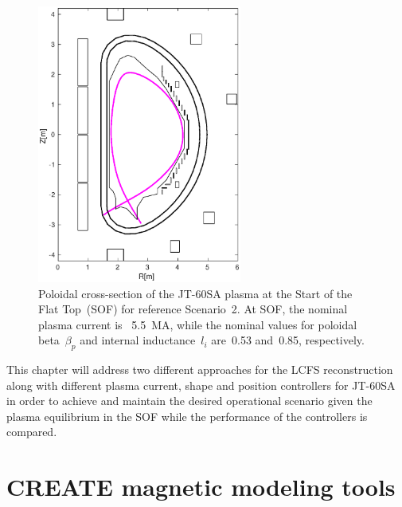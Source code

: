 \begin{figure}[h]
	\centering
	\includegraphics[width=0.6\textwidth]{Chp3/scenario2_SOF.eps}
	
	\caption{Poloidal cross-section of the JT-60SA plasma at the Start of the Flat Top~(SOF) for reference Scenario~2. At SOF, the nominal plasma current is ~5.5~MA, while the nominal values for poloidal beta~$\beta_p$ and internal inductance~$l_i$ are~0.53 and~0.85, respectively.	\label{SOF}}
\end{figure}



This chapter will address two different approaches for the LCFS reconstruction along  with different plasma current, shape and position controllers for JT-60SA in order to achieve and maintain the desired operational scenario given the plasma equilibrium in the SOF while the performance of the controllers is compared.



\section{CREATE magnetic modeling tools}

